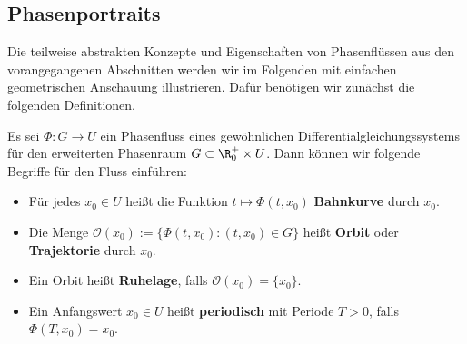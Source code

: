 \documentclass[letterpaper,10pt,english]{jupyterBook}
\begin{document}
\subsection{Phasenportraits}
\label{\detokenize{ode/fluesse:phasenportraits}}
\par
Die teilweise abstrakten Konzepte und Eigenschaften von Phasenflüssen aus den vorangegangenen Abschnitten werden wir im Folgenden mit einfachen geometrischen Anschauung illustrieren.
Dafür benötigen wir zunächst die folgenden Definitionen.
\label{ode/fluesse:definition-4}
\begin{definition}{}{}



\par
Es sei \(\Phi:G\rightarrow U\) ein Phasenfluss eines gewöhnlichen Differentialgleichungssystems für den erweiterten Phasenraum \(G\subset \R^+_0\times U\).
Dann können wir folgende Begriffe für den Fluss einführen:
\begin{itemize}
\item {} 
\par
Für jedes \(x_0\in U\) heißt die Funktion \(t\mapsto \Phi(t, x_0)\) \textbf{Bahnkurve} durch \(x_0\).

\item {} 
\par
Die Menge \(\mathcal{O}(x_0) := \{\Phi(t, x_0): (t, x_0)\in G\}\) heißt \textbf{Orbit} oder \textbf{Trajektorie} durch \(x_0\).

\item {} 
\par
Ein Orbit heißt \textbf{Ruhelage}, falls \(\mathcal{O}(x_0) = \{x_0\}\).

\item {} 
\par
Ein Anfangswert \(x_0\in U\) heißt \textbf{periodisch} mit Periode \(T>0\), falls \(\Phi(T, x_0) = x_0\).

\end{itemize}
\end{definition}
\end{document}
